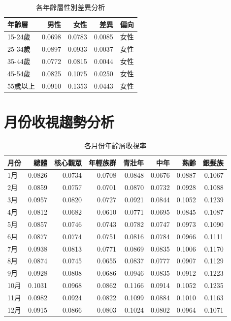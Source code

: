 \documentclass[12pt,a4paper]{article}
\begin{document}
\begin{table}[H]
\centering
\caption{各年齡層性別差異分析}
\begin{tabular}{lrrrl}
\toprule
年齡層 & 男性 & 女性 & 差異 & 偏向 \\
\midrule
15-24歲 & 0.0698 & 0.0783 & 0.0085 & 女性 \\
25-34歲 & 0.0897 & 0.0933 & 0.0037 & 女性 \\
35-44歲 & 0.0772 & 0.0815 & 0.0044 & 女性 \\
45-54歲 & 0.0825 & 0.1075 & 0.0250 & 女性 \\
55歲以上 & 0.0910 & 0.1353 & 0.0443 & 女性 \\

\bottomrule
\end{tabular}
\end{table}

\section{月份收視趨勢分析}

\begin{table}[H]
\centering
\caption{各月份年齡層收視率}
\begin{tabular}{lrrrrrrr}
\toprule
月份 & 總體 & 核心觀眾 & 年輕族群 & 青壯年 & 中年 & 熟齡 & 銀髮族 \\
\midrule
1月 & 0.0826 & 0.0734 & 0.0708 & 0.0848 & 0.0676 & 0.0887 & 0.1067 \\
2月 & 0.0859 & 0.0757 & 0.0701 & 0.0870 & 0.0732 & 0.0928 & 0.1088 \\
3月 & 0.0957 & 0.0820 & 0.0727 & 0.0921 & 0.0844 & 0.1052 & 0.1239 \\
4月 & 0.0812 & 0.0682 & 0.0610 & 0.0771 & 0.0695 & 0.0845 & 0.1087 \\
5月 & 0.0857 & 0.0746 & 0.0743 & 0.0782 & 0.0747 & 0.0973 & 0.1090 \\
6月 & 0.0877 & 0.0774 & 0.0751 & 0.0816 & 0.0784 & 0.0966 & 0.1111 \\
7月 & 0.0938 & 0.0813 & 0.0771 & 0.0869 & 0.0835 & 0.1006 & 0.1170 \\
8月 & 0.0874 & 0.0745 & 0.0655 & 0.0837 & 0.0777 & 0.0907 & 0.1129 \\
9月 & 0.0928 & 0.0808 & 0.0686 & 0.0946 & 0.0835 & 0.0912 & 0.1223 \\
10月 & 0.1031 & 0.0968 & 0.0862 & 0.1166 & 0.0914 & 0.1052 & 0.1235 \\
11月 & 0.0982 & 0.0924 & 0.0822 & 0.1099 & 0.0884 & 0.1010 & 0.1163 \\
12月 & 0.0915 & 0.0866 & 0.0803 & 0.1024 & 0.0802 & 0.0964 & 0.1071 \\

\bottomrule
\end{tabular}
\end{table}
\end{document}
